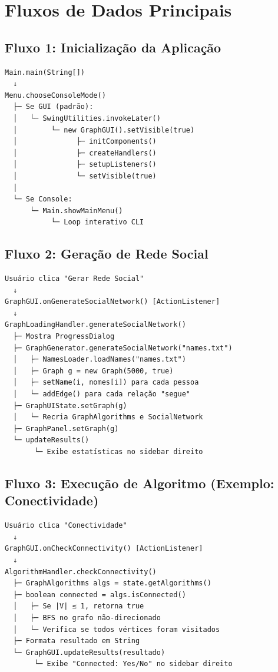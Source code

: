 \documentclass[12pt,a4paper]{article}
\begin{document}
\section{Fluxos de Dados Principais}

\subsection{Fluxo 1: Inicialização da Aplicação}

\begin{verbatim}
Main.main(String[])
  ↓
Menu.chooseConsoleMode()
  ├─ Se GUI (padrão):
  │   └─ SwingUtilities.invokeLater()
  │        └─ new GraphGUI().setVisible(true)
  │              ├─ initComponents()
  │              ├─ createHandlers()
  │              ├─ setupListeners()
  │              └─ setVisible(true)
  │
  └─ Se Console:
      └─ Main.showMainMenu()
           └─ Loop interativo CLI
\end{verbatim}

\subsection{Fluxo 2: Geração de Rede Social}

\begin{verbatim}
Usuário clica "Gerar Rede Social"
  ↓
GraphGUI.onGenerateSocialNetwork() [ActionListener]
  ↓
GraphLoadingHandler.generateSocialNetwork()
  ├─ Mostra ProgressDialog
  ├─ GraphGenerator.generateSocialNetwork("names.txt")
  │   ├─ NamesLoader.loadNames("names.txt")
  │   ├─ Graph g = new Graph(5000, true)
  │   ├─ setName(i, nomes[i]) para cada pessoa
  │   └─ addEdge() para cada relação "segue"
  ├─ GraphUIState.setGraph(g)
  │   └─ Recria GraphAlgorithms e SocialNetwork
  ├─ GraphPanel.setGraph(g)
  └─ updateResults()
       └─ Exibe estatísticas no sidebar direito
\end{verbatim}

\subsection{Fluxo 3: Execução de Algoritmo (Exemplo: Conectividade)}

\begin{verbatim}
Usuário clica "Conectividade"
  ↓
GraphGUI.onCheckConnectivity() [ActionListener]
  ↓
AlgorithmHandler.checkConnectivity()
  ├─ GraphAlgorithms algs = state.getAlgorithms()
  ├─ boolean connected = algs.isConnected()
  │   ├─ Se |V| ≤ 1, retorna true
  │   ├─ BFS no grafo não-direcionado
  │   └─ Verifica se todos vértices foram visitados
  ├─ Formata resultado em String
  └─ GraphGUI.updateResults(resultado)
       └─ Exibe "Connected: Yes/No" no sidebar direito
\end{verbatim}
\end{document}
